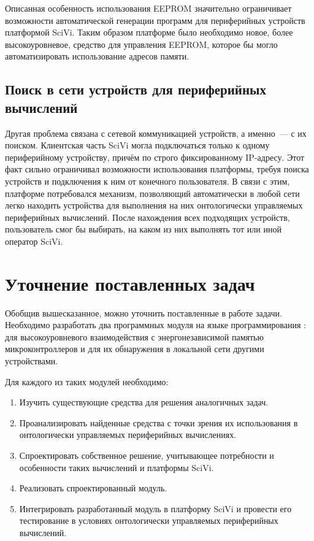 Описанная особенность использования EEPROM значительно ограничивает возможности автоматической генерации программ для периферийных устройств платформой SciVi.
Таким образом платформе было необходимо новое, более высокоуровневое, средство для управления EEPROM, которое бы могло автоматизировать использование адресов памяти.

\subsection{Поиск в сети устройств для периферийных вычислений}

Другая проблема связана с сетевой коммуникацией устройств, а именно~--- с их поиском.
Клиентская часть SciVi могла подключаться только к одному периферийному устройству, причём по строго фиксированному IP-адресу.
Этот факт сильно ограничивал возможности использования платформы, требуя поиска устройств и подключения к ним от конечного пользователя.
В связи с этим, платформе потребовался механизм, позволяющий автоматически в любой сети легко находить устройства для выполнения на них онтологически управляемых периферийных вычислений.
После нахождения всех подходящих устройств, пользователь смог бы выбирать, на каком из них выполнять тот или иной оператор SciVi.

\section{Уточнение поставленных задач}

Обобщив вышесказанное, можно уточнить поставленные в работе задачи.
Необходимо разработать два программных модуля на языке программирования \CPP: для высокоуровневого взаимодействия с энергонезависимой памятью микроконтроллеров и для их обнаружения в локальной сети другими устройствами.

Для каждого из таких модулей необходимо:
\begin{enumerate}
	\item Изучить существующие средства для решения аналогичных задач.
	\item Проанализировать найденные средства с точки зрения их использования в онтологически управляемых периферийных вычислениях.
	\item Спроектировать собственное решение, учитывающее потребности и особенности таких вычислений и платформы SciVi.
	\item Реализовать спроектированный модуль.
	\item Интегрировать разработанный модуль в платформу SciVi и провести его тестирование в условиях онтологически управляемых периферийных вычислений.
\end{enumerate}
